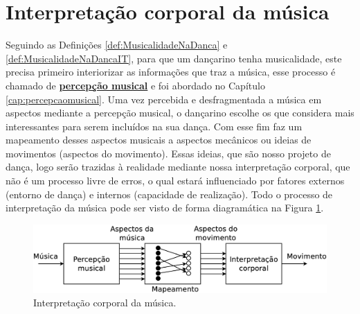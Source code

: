 \section{Interpretação corporal da música}
\label{sec:interpretacioncorporal}

Seguindo as Definições \ref{def:MusicalidadeNaDanca} e \ref{def:MusicalidadeNaDancaIT},
para que um dançarino tenha musicalidade, este precisa primeiro interiorizar as informações que traz a música,  
esse processo é chamado de \hyperref[cap:percepcaomusical]{\textbf{percepção musical}} 
e foi abordado no Capítulo \ref{cap:percepcaomusical}.
Uma vez percebida e desfragmentada a música em aspectos mediante a percepção musical,
o dançarino escolhe os que considera mais interessantes para serem incluídos na sua dança.
Com esse fim faz um mapeamento desses aspectos musicais a aspectos mecânicos ou ideias de movimentos (aspectos do movimento).
Essas ideias, que são nosso projeto de dança, logo serão trazidas à realidade mediante nossa interpretação corporal, 
que não é um processo livre de erros, o qual estará influenciado por fatores externos (entorno de dança) e 
internos (capacidade de realização).
Todo o processo de interpretação da música pode ser visto de forma diagramática na Figura \ref{fig:interpretacion-corporal}.
\begin{figure}[!h]
  \centering
    \includegraphics[width=1.00\textwidth]{chapters/cap-musicalidade/interpretacion-corporal.eps}
\caption{Interpretação corporal da música.}
\label{fig:interpretacion-corporal}
\end{figure}

